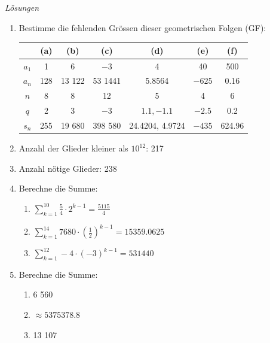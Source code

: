 \clearpage
\emph{Lösungen}
\begin{enumerate}
    \item Bestimme die fehlenden Grössen dieser geometrischen Folgen (GF):
    
    \begin{center}
        \begin{tabular}{|c|c|c|c|c|c|c|}
        \hline
         & (a) & (b) & (c) & (d) & (e) & (f) \\
        \hline
        $a_1$ & 1 & 6 &  $-3$& 4 & 40 &  500\\
        \hline
        $a_n$ & 128 & 13 122 & 53 1441& 5.8564  & $-625$ & 0.16 \\
        \hline
        $n$ & 8 &  8& 12 & 5 & 4 & 6 \\
        \hline
        $q$ & 2 & 3 & $-3$ &  $1.1, -1.1$& $-2.5$ & 0.2 \\
        \hline
        $s_n$ & 255 &19 680  & 398 580 & 24.4204, 4.9724 & $-435$ & 624.96 \\
        \hline
        \end{tabular}
        \end{center}
    
    \item Anzahl der Glieder kleiner als $10^{12}$: 217
    \item Anzahl nötige Glieder:  238

    \item Berechne die Summe:
    \begin{enumerate}
        \item $\sum\limits_{k=1}^{10} \frac{5}{4}\cdot2^{k-1} = \frac{5115}{4}$
        \item $\sum\limits_{k=1}^{14} 7680 \cdot \left(\frac{1}{2}\right)^{k-1}  = 15359.0625$
        \item $\sum\limits_{k=1}^{12} -4 \cdot (-3)^{k-1}    = 531 440$
    \end{enumerate}
    
    \item Berechne die Summe:
    \begin{enumerate}
        \item 6 560
        \item $\approx5 375 378.8$
        \item 13 107
    \end{enumerate}
    

\end{enumerate}
